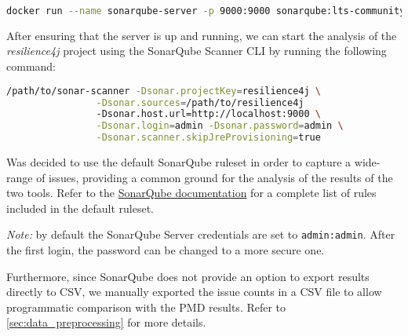 \begin{lstlisting}[language=bash, caption={Starting the SonarQube server}]
docker run --name sonarqube-server -p 9000:9000 sonarqube:lts-community
\end{lstlisting}

\noindent After ensuring that the server is up and running, we can start the analysis of the \textit{resilience4j} project using the SonarQube Scanner CLI by running the following command:

\begin{lstlisting}[language=bash, caption={Command to run SonarQube analysis on \textit{resilience4j} project codebase}]
              /path/to/sonar-scanner -Dsonar.projectKey=resilience4j \
                -Dsonar.sources=/path/to/resilience4j 
                -Dsonar.host.url=http://localhost:9000 \
                -Dsonar.login=admin -Dsonar.password=admin \
                -Dsonar.scanner.skipJreProvisioning=true
\end{lstlisting}

Was decided to use the default SonarQube ruleset in order to capture a wide-range of issues, providing a common ground for the analysis of the results of the two tools. Refer to the \href{https://docs.sonarqube.org/latest/analysis/languages/java/}{SonarQube documentation} for a complete list of rules included in the default ruleset.

\noindent \textit{Note:} by default the SonarQube Server credentials are set to \texttt{admin:admin}. After the first login, the password can be changed to a more secure one.

Furthermore, since SonarQube does not provide an option to export results directly to CSV, we manually exported the issue counts in a CSV file to allow programmatic comparison with the PMD results. Refer to \autoref{sec:data_preprocessing} for more details.
